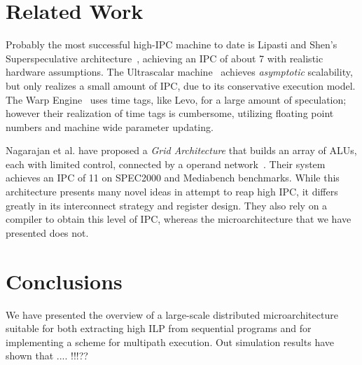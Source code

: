 \documentclass[10pt,dvips]{article}
\begin{document}

%
\section{Related Work}
%
Probably the most successful high-IPC machine to date is
Lipasti and Shen's Superspeculative
architecture~\cite{Lip97}, achieving an IPC of
about 7 with realistic hardware assumptions.
The Ultrascalar machine~\cite{Hen00}
achieves {\em asymptotic} scalability,
but only realizes a small amount of IPC,
due to its conservative execution model.
The Warp Engine~\cite{Cle95}
uses time tags, like Levo, for a large amount of speculation;
however their realization of time
tags is cumbersome, utilizing floating point
numbers and machine wide parameter updating.

Nagarajan et al. have proposed a {\em Grid Architecture} that
builds an array of ALUs, each with limited control, connected
by a operand network~\cite{Nag01}.  Their system achieves an IPC of 11 on
SPEC2000 and Mediabench benchmarks.  While this architecture
presents many novel ideas in attempt to reap high IPC, it
differs greatly in its interconnect strategy and register design.
They also rely on a compiler to obtain this level of IPC, whereas
the microarchitecture that we have presented does not.
%
\section{Conclusions}
%
We have presented the overview of a large-scale distributed 
microarchitecture suitable for both extracting high ILP from
sequential programs and for implementing a scheme for
multipath execution.
Out simulation results have shown that .... !!!??




\end{document}
